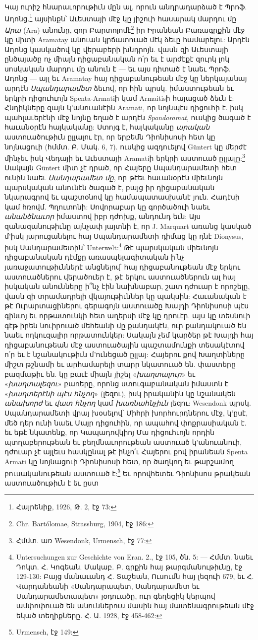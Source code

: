 \documentclass{article}
\begin{document}
{Կայ ուրիշ հնարաւորութիւն մըն ալ, որուն անդրադարձած է Պրոֆ. Ադոնց.\footnote{Հայրենիք, 1926, Թ. 2, էջ 73:} այսինքն՝ Աւեստայի մէջ կը յիշուի հասարակ մարդու մը \emph{Արա} (Ara) անունը, զոր Բարտոլոմէ\footnote{Chr. Bartólomae, Strassburg, 1904, էջ 186:} իր Իրանեան Բառագրքին մէջ կը միտի Aramatay անուան կրճատուած մէկ ձեւը համարելու: Արդէն Ադոնց կասկածով կը վերաբերի խնդրոյն. վասն զի Աւեստայի ընծայածը ոչ միայն դիցաբանական ո՛ր եւ է արժէքէ զուրկ լոկ սոսկական մարդու մը անուն է — եւ այս դիտած է նաեւ Պրոֆ. Ադոնց — այլ եւ Aramatay հայ դիցաբանութեան մէջ կը ներկայանայ արդէն \emph{Սպանդարամետ} ձեւով, որ հին պրսկ. իմաստութեան եւ երկրի դիցուհւոյն Spenta-Armatiի կամ Armaitisի հայացած ձեւն է: Հնդիկները զայն կ'անուանէին Aramati, որ նոյնպէս դիցուհի է. իսկ պահլաւերէնի մէջ նոյնը եղած է արդէն \emph{Spandaramat}, ուսկից ծագած է հաւանօրէն հայկականը: Ստոյգ է, հայկականը \emph{արական} աստուածութիւն ըլլալու էր, որ երբեմն Դիոնիսոսի հետ կը նոյնացուի (հմմտ. Բ. Մակ. 6, 7). ուսկից ազդուելով Güntert կը մերժէ մինչեւ իսկ Վեդայի եւ Աւեստայի Aramatiի երկրի աստուած ըլլալը:\footnote{Հմմտ. առ Wesendonk, Urmensch, էջ 77:} Սակայն Güntert միտ չէ դրած, որ Հայերը Սպանդարամետի հետ ունին նաեւ \emph{Սանդարամետ մը}, որ թէեւ հաւանօրէն միեւնոյն պարսկական անունէն ծագած է, բայց իր դիցաբանական նկարագրով եւ պաշտօնով կը համապատասխանէ յուն. Հադէսի կամ հռովմ. Պղուտոնի: Սովորաբար կը գործածուի նաեւ \emph{անանծնաւոր} իմաստով իբր դժոխք, անդունդ եւն: Այս զանազանութիւնը այնչափ յայտնի է, որ J. Marquart առանց կասկած մ'իսկ յարուցանելու հայ Սպանդարամետի դիմաց կը դնէ Dionysus, իսկ Սանդարամետին՝ Unterwelt:\footnote{Untersuchungen zur Geschichte von Eran. 2., էջ 105, ծն. 5: — Հմմտ. նաեւ Դոկտ. Հ. Կոգեան. Մակաբ. Բ. գրքին հայ թարգմանութիւնը, էջ 129-130: Բայց մանաւանդ Հ. Տաշեան, Ուսումն հայ լեզուի 679, եւ Հ. Վարդանեանի «Սանդարապետ, Սանդարամետ եւ Սանդարամետապետ» յօդուածը, ուր գեղեցիկ կերպով ամփոփուած են անուններուս մասին հայ մատենագրութեան մէջ եկած տեղիքները. Հ. Ա. 1928, էջ 458-462:} Թէ պարսկական միեւնոյն դիցաբանական դէմքը առասպելագիտական ի՛նչ յառաջատութիւններէ անցնելով՝ հայ դիցաբանութեան մէջ երկու աստուածներու վերածուեր է, թէ երկու աստուածներուն ալ հայ իսկական անունները ի՞նչ էին նախնաբար, շատ դժուար է որոշելը, վասն զի տրամադրելի վկայութիւններ կը պակսին: Հաւանական է թէ Ուրարտացիներու գերագոյն աստուածը Խալդի Դիոնիսոսի պէս գինւոյ եւ որթատունկի հետ աղերսի մէջ կը դրուէր. այս կը տեսնուի գէթ իրեն նուիրուած մեհեանի մը քանդակէն, ուր քանդակուած են նաեւ ողկուզալիր որթատունկեր: Սակայն չեմ կարծեր թէ Խալդի հայ դիցաբանութեան մէջ աստուածային պաշտամունքի տեսակէտով ո՛ր եւ է նշանակութիւն մ'ունեցած ըլլայ: Հայերու քով Խաղտիները միշտ թշնամի եւ արհամարելի տարր նկատուած են. փաստերը բազմաթիւ են. կը բաւէ միայն յիշել «\emph{խաղտալուր}» եւ «\emph{խաղտալեզու}» բառերը, որոնց ստուգաբանական իմաստն է «\emph{խաղտերէնի պէս հնչող}» (լեզու), իսկ իրականին կը նշանակեն \emph{անախորժ} եւ \emph{վատ հնչող} կամ \emph{խառնահնչիւն} լեզու: Wesendonk պրսկ. Սպանդարամետի վրայ խօսելով՝ Միհրի խորհուրդներու մէջ, կ'ըսէ, մեծ դեր ունի նաեւ Մայր դիցուհին, որ ապահով փոքրասիական է. եւ եթէ նկատենք, որ Կապադովկիոյ Մա դիցուհւոյն որդին պտղաբերութեան եւ բեղմնաւորութեան աստուած կ'անուանուի, դժուար չէ այլեւս հասկընալ թէ ինչո՛ւ Հայերու քով իրանեան Spenta Armati կը նոյնացուի Դիոնիսոսի հետ, որ ծաղկող եւ թարշամող բուսականութեան աստուած է:\footnote{Urmensch, էջ 149:} Եւ որովհետեւ Դիոնիսոս թրակեան աստուածութիւն է եւ ըստ }
\end{document}
